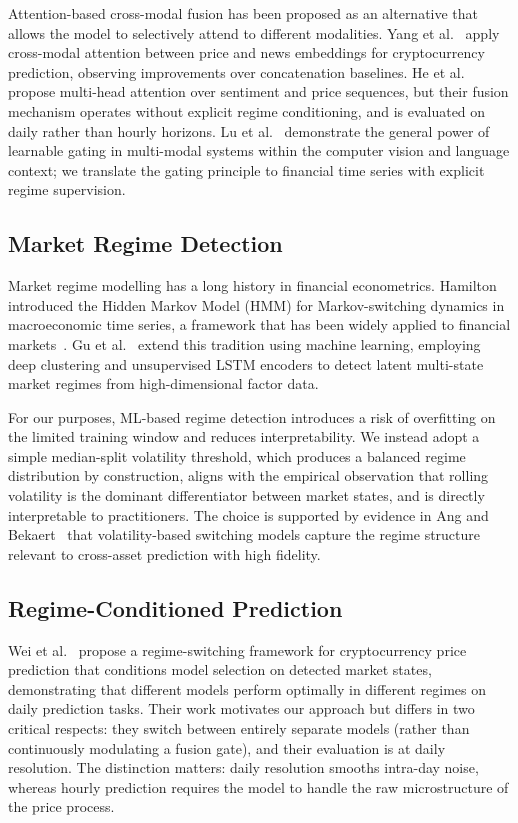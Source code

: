 \documentclass[journal]{IEEEtran}
\begin{document}
Attention-based cross-modal fusion has been proposed as an alternative that
allows the model to selectively attend to different modalities. Yang
et al.~\cite{yang2021} apply cross-modal attention between price and news
embeddings for cryptocurrency prediction, observing improvements over
concatenation baselines. He et al.~\cite{he2023multi} propose multi-head
attention over sentiment and price sequences, but their fusion mechanism
operates without explicit regime conditioning, and is evaluated on daily
rather than hourly horizons. Lu et al.~\cite{lu2022} demonstrate the general
power of learnable gating in multi-modal systems within the computer vision
and language context; we translate the gating principle to financial time series
with explicit regime supervision.

\subsection{Market Regime Detection}
Market regime modelling has a long history in financial econometrics.
Hamilton~\cite{hamilton1989new} introduced the Hidden Markov Model (HMM) for
Markov-switching dynamics in macroeconomic time series, a framework that has
been widely applied to financial markets~\cite{ang2002regime}. Gu et
al.~\cite{gu2021regime} extend this tradition using machine learning,
employing deep clustering and unsupervised LSTM encoders to detect latent
multi-state market regimes from high-dimensional factor data.

For our purposes, ML-based regime detection introduces a risk of overfitting
on the limited training window and reduces interpretability. We instead adopt
a simple median-split volatility threshold, which produces a balanced regime
distribution by construction, aligns with the empirical observation that
rolling volatility is the dominant differentiator between market states, and
is directly interpretable to practitioners. The choice is supported by
evidence in Ang and Bekaert~\cite{ang2002regime} that volatility-based
switching models capture the regime structure relevant to cross-asset
prediction with high fidelity.

\subsection{Regime-Conditioned Prediction}
Wei et al.~\cite{wei2023} propose a regime-switching framework for
cryptocurrency price prediction that conditions model selection on detected
market states, demonstrating that different models perform optimally in
different regimes on daily prediction tasks. Their work motivates our
approach but differs in two critical respects: they switch between
entirely separate models (rather than continuously modulating a fusion
gate), and their evaluation is at daily resolution. The distinction matters:
daily resolution smooths intra-day noise, whereas hourly prediction requires
the model to handle the raw microstructure of the price process.
\end{document}
